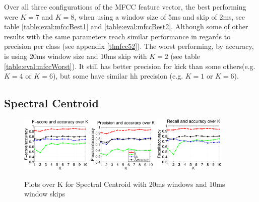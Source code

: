 		
		Over all three configurations of the MFCC feature vector, the best performing were $K=7$ and $K=8$, when using a window size of 5ms and skip of 2ms, see table \ref{table:eval:mfccBest1} and \ref{table:eval:mfccBest2}. Although some of other results with the same parameters reach similar performance in regards to precision per class (see appendix \ref{tlmfcc52}). The worst performing, by accuracy, is using 20ms window size and 10ms skip with $K=2$ (see table \ref{table:eval:mfccWorst}). It still has better precision for kick than some others(e.g. $K=4$ or $K=6$), but some have similar hh precision (e.g. $K=1$ or $K=6$). 
		
	\subsection{Spectral Centroid}
		\begin{figure}
			\centering\includegraphics[width=0.3\textwidth]{tex/appendices/test/scentroid2010FP.png}
			\centering\includegraphics[width=0.3\textwidth]{tex/appendices/test/scentroid2010_P.png}
			\centering\includegraphics[width=0.3\textwidth]{tex/appendices/test/scentroid2010_R.png}
			
			\caption{Plots over K for Spectral Centroid with 20ms windows and 10ms window skips}
		\end{figure}

